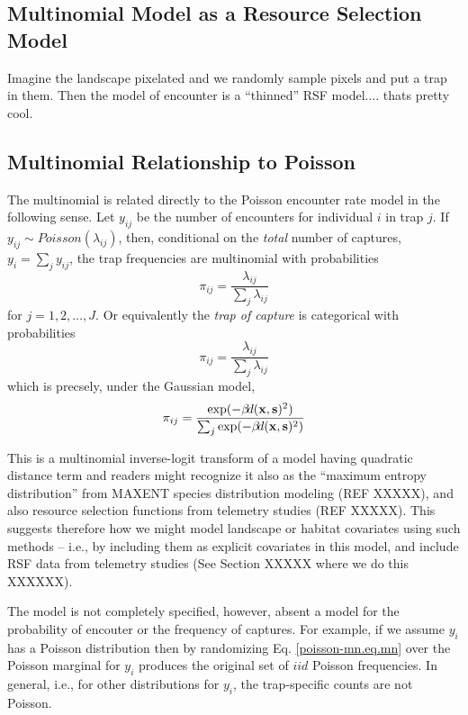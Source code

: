 \subsection{Multinomial Model as a Resource Selection Model}

Imagine the landscape pixelated and we randomly sample pixels and put
a trap in them.  Then the model of encounter is a ``thinned'' RSF
model.... thats pretty cool. 

\subsection{Multinomial Relationship to Poisson}

The multinomial is related directly to the Poisson encounter rate
model in the following sense. Let $y_{ij}$ be the number of
encounters for individual $i$ in trap $j$. If $y_{ij} \sim
Poisson(\lambda_{ij})$,
then, 
conditional on the {\it total}
number of captures, $y_{i} = \sum_{j} y_{ij}$, the trap frequencies are multinomial with
probabilities
\[
 \pi_{ij} =  \frac{ \lambda_{ij} } { \sum_{j} \lambda_{ij} } 
\]
for $j=1,2,\ldots,J$.
Or equivalently the {\it trap of
  capture} is categorical with probabilities
\[
 \pi_{ij} =  \frac{ \lambda_{ij} } { \sum_{j} \lambda_{ij} } 
\]
which is precsely, under the Gaussian model, 
\begin{equation} 
\pi_{ij} =  \frac{ \exp( - \beta \! d({\bf x},{\bf s})^2 ) }  {
   \sum_{j} \exp(-\beta \! d({\bf x},{\bf s})^2)}
\label{poisson-mn.eq.mnprobs}
\end{equation}

This is a multinomial inverse-logit transform of a model having
quadratic distance term and readers might recognize it
also as the ``maximum entropy distribution'' from MAXENT
species distribution modeling (REF XXXXX), and also resource selection functions
from telemetry studies (REF XXXXX). This suggests therefore how we might model
landscape or habitat covariates using such methods -- i.e., by
including them as explicit covariates in this model, and include
RSF data from telemetry studies (See Section XXXXX
where we do this XXXXXX).  

The model is not completely specified, however, absent a model for the
probability of encouter or the frequency of captures. For example, if
we assume $y_{i}$ has a Poisson distribution then by randomizing
Eq. \ref{poisson-mn.eq.mn}
over the Poisson marginal for 
$y_{i}$ produces the original set of $iid$ Poisson frequencies. In
general, i.e., for other distributions for $y_{i}$, the trap-specific
counts are not Poisson.

